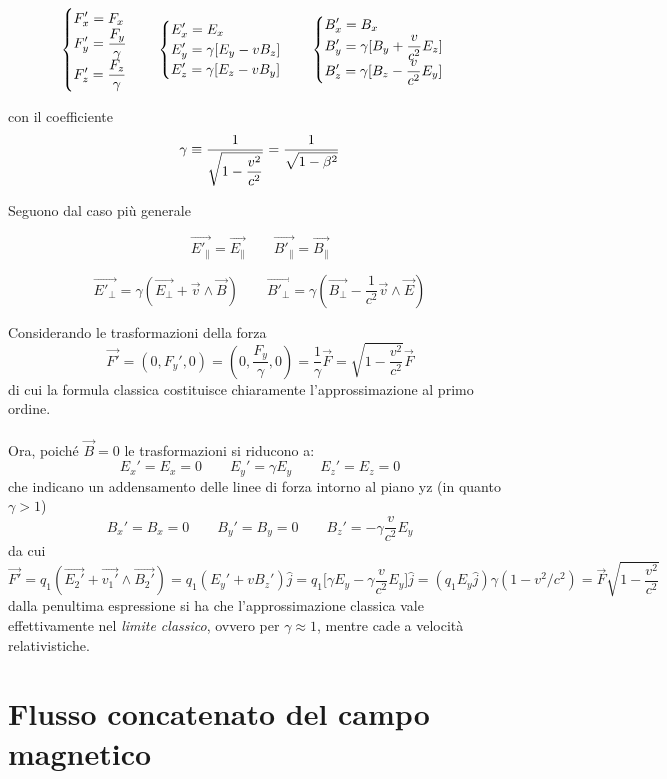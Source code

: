 \[\begin{cases}
\displaystyle F_x' = F_x \\
\displaystyle F_y' = \frac{F_y}{\gamma}\\
\displaystyle F_z' = \frac{F_z}{\gamma}
\end{cases}\quad 
\begin{cases}
\displaystyle E_x' = E_x \\
\displaystyle E_y' = \gamma [E_y - v B_z]\\
\displaystyle E_z' = \gamma [E_z - v B_y]
\end{cases}\quad
\begin{cases}
\displaystyle B_x' = B_x \\
\displaystyle B_y' = \gamma [B_y + \frac{v}{c^2} E_z]\\
\displaystyle B_z' = \gamma [B_z - \frac{v}{c^2} E_y]
\end{cases}\]

con il coefficiente 
\[\gamma \equiv \frac{1}{\displaystyle \sqrt{1 - \frac{v^2}{c^2}}} = \frac{1}{\displaystyle \sqrt{1 - \beta^2}}\]

Seguono dal caso più generale

\[ \vec{E'_\parallel} = \vec{E_\parallel} \qquad \vec{B'_\parallel} = \vec{B_\parallel}\]

\[\vec{E'_\perp} = \gamma (\vec{E_\perp} + \vec{v} \wedge \vec{B}) \qquad \vec{B'_\perp} = \gamma (\vec{B_\perp} - \frac{1}{c^2} \vec{v} \wedge \vec{E})\]

Considerando le trasformazioni della forza
\[\vec{F'} = (0, F_y', 0) = (0, \frac{F_y}{\gamma}, 0) = \frac{1}{\gamma} \vec{F} = \sqrt{1 - \frac{v^2}{c^2}} \vec{F}\]
di cui la formula classica costituisce chiaramente l'approssimazione al primo ordine.
\\~\\Ora, poiché $\vec{B} = 0$ le trasformazioni si riducono a:
\[E_x' = E_x = 0 \qquad E_y' = \gamma E_y \qquad E_z' = E_z = 0\]
che indicano un addensamento delle linee di forza intorno al piano yz (in quanto $\gamma > 1$)
\[B_x' = B_x = 0 \qquad B_y' = B_y = 0 \qquad B_z' = - \gamma \frac{v}{c^2} E_y\]
da cui
\[\vec{F'} = q_1(\vec{E_2'} + \vec{v_1'} \wedge \vec{B_2'}) = q_1 (E_y' + v B_z') \hat{j} = q_1 \big[\gamma E_y - \gamma \frac{v}{c^2} E_y\big] \hat{j} = (q_1 E_y \hat{j}) \gamma (1 - v^2/c^2) = \vec{F} \sqrt{1 - \frac{v^2}{c^2}}\]
dalla penultima espressione si ha che l'approssimazione classica vale effettivamente nel \textit{limite classico}, ovvero per $\gamma \approx 1$, mentre cade a velocità relativistiche.

\section{Flusso concatenato del campo magnetico}

